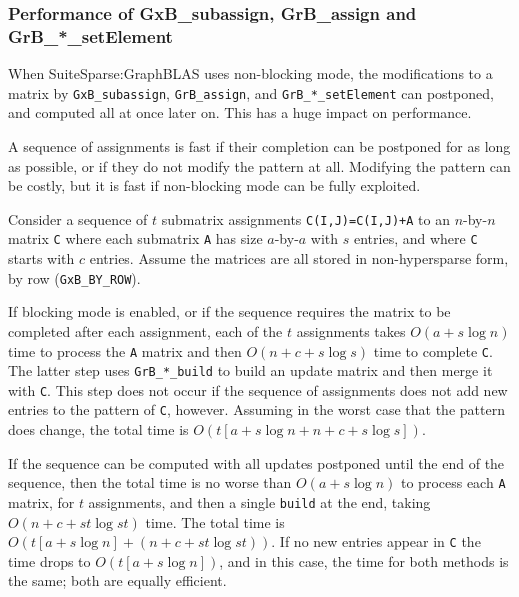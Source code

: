 \documentclass[12pt]{article}
\begin{document}
\newpage
\subsubsection{Performance of {\sf GxB\_subassign}, {\sf GrB\_assign}
and {\sf GrB\_*\_setElement}}

When SuiteSparse:GraphBLAS uses non-blocking mode, the modifications to a
matrix by \verb'GxB_subassign', \verb'GrB_assign', and \verb'GrB_*_setElement'
can postponed, and computed all at once later on.  This has a huge impact on
performance.

A sequence of assignments is fast if their completion can be postponed for as
long as possible, or if they do not modify the pattern at all.  Modifying the
pattern can be costly, but it is fast if non-blocking mode can be fully
exploited.

Consider a sequence of $t$ submatrix assignments \verb'C(I,J)=C(I,J)+A' to an
$n$-by-$n$ matrix \verb'C' where each submatrix \verb'A' has size $a$-by-$a$
with $s$ entries, and where \verb'C' starts with $c$ entries.
Assume the matrices are all stored in non-hypersparse form, by row
(\verb'GxB_BY_ROW').

If blocking mode is enabled, or if the sequence requires the matrix to be
completed after each assignment, each of the $t$ assignments takes $O(a + s
\log n)$ time to process the \verb'A' matrix and then $O(n + c + s \log s)$
time to complete \verb'C'.  The latter step uses \verb'GrB_*_build' to build an
update matrix and then merge it with \verb'C'.  This step does not occur if the
sequence of assignments does not add new entries to the pattern of \verb'C',
however.  Assuming in the worst case that the pattern does change, the total
time is $O (t \left[ a + s \log n + n + c + s \log s \right] )$.

If the sequence can be computed with all updates postponed until the end of the
sequence, then the total time is no worse than $O(a + s \log n)$ to process
each \verb'A' matrix, for $t$ assignments, and then a single \verb'build' at
the end, taking $O(n + c + st \log st)$ time.
The total time is $O (t \left [a + s \log n \right] + (n + c + st \log st))$.
If no new entries appear in
\verb'C' the time drops to $O (t \left [a + s \log n \right])$, and in this
case, the time for both methods is the same; both are equally efficient.
\end{document}
